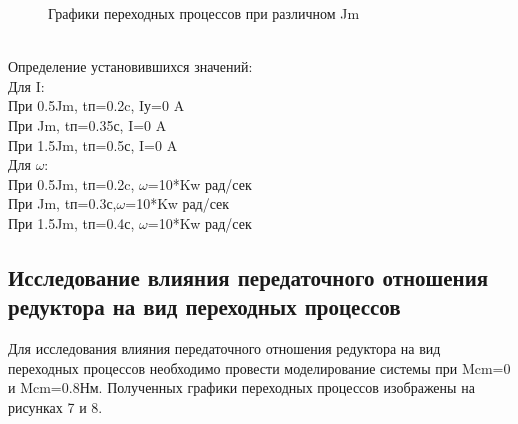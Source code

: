 \documentclass[a4paper, 12pt]{article}
\begin{document}
\begin{figure}[h]
\begin{minipage}[h]{0.55\linewidth}
\end{minipage}
\hfill
\begin{minipage}[h]{0.55\linewidth}
\end{minipage}
\vfill
\begin{minipage}[h]{0.55\linewidth}
\centering{\texttt{[image: w3]} \\ $\omega$}
\end{minipage}
\hfill
\begin{minipage}[h]{0.55\linewidth}
\end{minipage}
\caption{Графики переходных процессов при различном Jm}
\end{figure}\\
Определение установившихся значений:\\
Для I:\\
При 0.5Jm, tп=0.2c, Iу=0 A\\
При Jm, tп=0.35с, I=0 A\\
При 1.5Jm, tп=0.5с, I=0 A\\
Для $\omega$:\\
При 0.5Jm, tп=0.2c,  $\omega$=10*Kw рад/сек\\
При Jm, tп=0.3с,$\omega$=10*Kw рад/сек\\
При 1.5Jm, tп=0.4с, $\omega$=10*Kw рад/сек
\newpage
\begin{center}
\section{Исследование влияния передаточного отношения редуктора на вид переходных процессов}
\end{center}\par
Для исследования влияния передаточного отношения редуктора на вид переходных процессов необходимо провести моделирование системы при Mcm=0 и Mcm=0.8Нм. Полученных графики переходных процессов изображены на рисунках 7 и 8.
\end{document}

